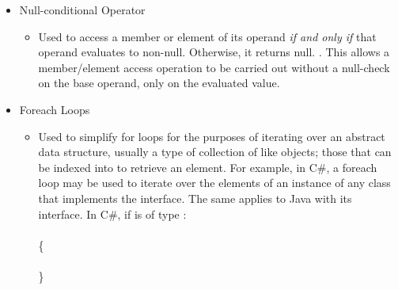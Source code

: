 \documentclass{article}
\begin{document}
\begin{itemize}
\begin{itemize}
                \end{itemize}
            \item Null-conditional Operator
                \begin{itemize}
                    \item Used to access a member or element of its operand \emph{if and only if} that operand evaluates to non-null. Otherwise, it returns null. \citep{cs6Spec}. This allows a member/element access operation to be carried out without a null-check on the base operand, only on the evaluated value.
                \end{itemize}
             \item Foreach Loops
                \begin{itemize}
                    \item Used to simplify for loops for the purposes of iterating over an abstract data structure, usually a type of collection of like objects; those that can be indexed into to retrieve an element. For example, in C\#, a foreach loop may be used to iterate over the elements of an instance of any class that implements the  interface. The same applies to Java with its  interface. In C\#, if  is of type :
                    \\

                    \\
                    \{\\
                    \hspace*{1cm}\\
                    \}
                    \\


\end{itemize}
\end{itemize}
\end{document}
